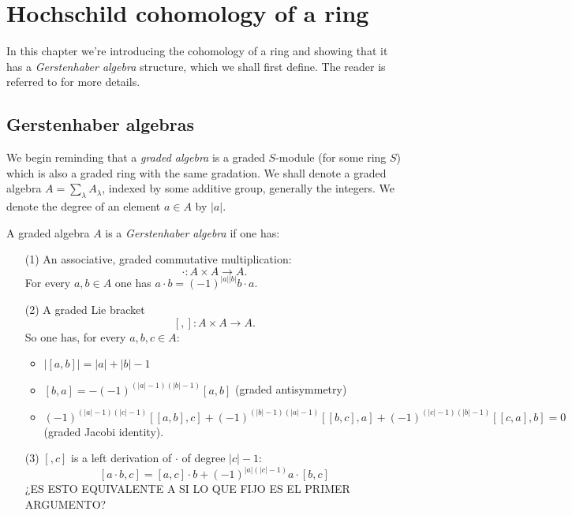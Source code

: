 \documentclass[TFM.tex]{subfiles}
\begin{document}
\chapter{Hochschild cohomology of a ring}

In this chapter we're introducing the cohomology of a ring and showing that it has a \emph{Gerstenhaber algebra} structure, which we shall first define. The reader is referred to \cite{Gerstenhaber} for more details.  


\section{Gerstenhaber algebras}

We begin reminding that a \emph{graded algebra} is a graded $S$-module (for some ring $S$) which is also a graded ring with the same gradation. We shall denote a graded algebra $A=\sum_\lambda A_\lambda$, indexed by some additive group, generally the integers. We denote the degree of an element $a\in A$ by $|a|$. %


\begin{defi}\label{defi1}
A graded algebra $A$ is a \emph{Gerstenhaber algebra} if one has:
\begin{enumerate}
\item[(1)] An associative, graded commutative multiplication:
\[
\cdot: A\times A\to A.
\]
For every $a,b\in A$ one has $a\cdot b=(-1)^{|a||b|}b\cdot a$.

\item[(2)] A graded Lie bracket 
\[
[,]:A\times A\to A.
\]
So one has, for every $a,b,c\in A$:
\begin{itemize}
\item $|[a,b]|=|a|+|b|-1$
\item $[b,a]=-(-1)^{(|a|-1)(|b|-1)}[a,b]$ (graded antisymmetry)
\item $(-1)^{(|a|-1)(|c|-1)}[[a,b],c]+(-1)^{(|b|-1)(|a|-1)}[[b,c],a]+(-1)^{(|c|-1)(|b|-1)}[[c,a],b]=0$ (graded Jacobi identity). 
\end{itemize}
\item[(3)]  $[,c]$ is a left derivation of $\cdot$ of degree $|c|-1$: %
\[
[a\cdot b,c]=[a,c]\cdot b+(-1)^{|a|(|c|-1)}a\cdot [b,c]
\]
¿ES ESTO EQUIVALENTE A SI LO QUE FIJO ES EL PRIMER ARGUMENTO?
\end{enumerate}
\end{defi}
\end{document}
